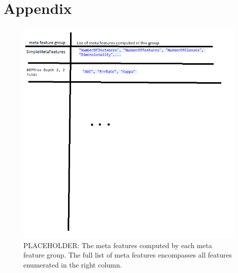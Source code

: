 %
\chapter{Appendix}
\label{sec:appendix}

\begin{figure}
\includegraphics[width=\textwidth]{gfx/placeholder_allMetaFeatures}
\caption{PLACEHOLDER: The meta features computed by each meta feature group. The full list of meta features encompasses all features enumerated in the right column.}
\label{fig:metaFeaturesDetails}
\end{figure}